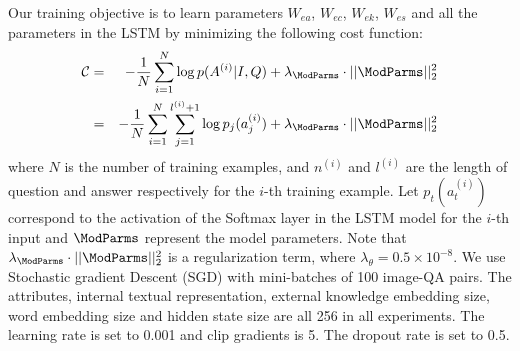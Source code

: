 Our training objective is to learn parameters $W_{ea}$, $W_{ec}$, $W_{ek}$, $W_{es}$ and all the parameters in the LSTM by minimizing the following cost function:
\begin{eqnarray}
    \mathcal{C}&=&-\frac{1}{N}\sum_{i=1}^N\log p(A^{(i)}|I,Q)+\lambda_\ModParms\cdot||\ModParms||_2^2 \\
    &=&-\frac{1}{N}\sum_{i=1}^N\sum_{j=1}^{l^{(i)}+1}\log p_j(a_j^{(i)})+\lambda_\ModParms\cdot||\ModParms||_2^2
\end{eqnarray}
where $N$ is the number of training examples, and $n^{(i)}$ and $l^{(i)}$ are the length of question and answer respectively for the $i$-th training example. Let $p_t(a_t^{(i)})$ correspond to the activation of the Softmax layer in the LSTM model for the $i$-th input and $\ModParms$ represent the model parameters. Note that $\lambda_\ModParms\cdot||\ModParms||_2^2$ is a regularization term, where $\lambda_\theta=0.5\times10^{-8}$. We use Stochastic gradient Descent (SGD) with mini-batches of 100 image-QA pairs. The attributes, internal textual representation, external knowledge embedding size, word embedding size and hidden state size are all 256 in all experiments. The learning rate is set to 0.001 and clip gradients is 5. The dropout rate is set to 0.5.
